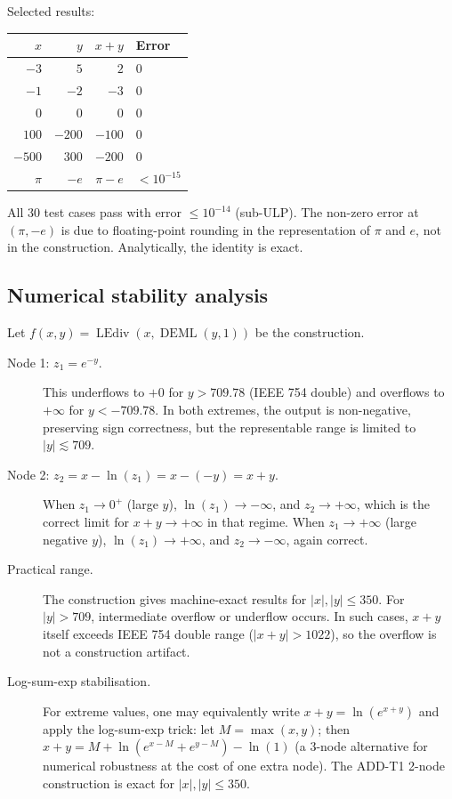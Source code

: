 \documentclass[12pt,a4paper]{article}
\theoremstyle{definition}
\newcommand{\DEML}{\operatorname{DEML}}
\newcommand{\LEdiv}{\operatorname{LEdiv}}
\begin{document}
Selected results:

\begin{center}
\begin{tabular}{rrrl}
\toprule
$x$ & $y$ & $x+y$ & Error \\
\midrule
$-3$   & $5$    & $2$       & $0$ \\
$-1$   & $-2$   & $-3$      & $0$ \\
$0$    & $0$    & $0$       & $0$ \\
$100$  & $-200$ & $-100$    & $0$ \\
$-500$ & $300$  & $-200$    & $0$ \\
$\pi$  & $-e$   & $\pi - e$ & $< 10^{-15}$ \\
\bottomrule
\end{tabular}
\end{center}

All 30 test cases pass with error $\le 10^{-14}$ (sub-ULP).
The non-zero error at $(\pi, -e)$ is due to floating-point rounding in the
representation of $\pi$ and $e$, not in the construction.
Analytically, the identity is exact.

\subsection{Numerical stability analysis}

Let $f(x,y) = \LEdiv(x, \DEML(y,1))$ be the construction.

\begin{description}
\item[Node 1: $z_1 = e^{-y}$.]
  This underflows to $+0$ for $y > 709.78$ (IEEE 754 double) and overflows
  to $+\infty$ for $y < -709.78$.
  In both extremes, the output is non-negative, preserving sign correctness,
  but the representable range is limited to $|y| \lesssim 709$.

\item[Node 2: $z_2 = x - \ln(z_1) = x - (-y) = x + y$.]
  When $z_1 \to 0^+$ (large $y$), $\ln(z_1) \to -\infty$, and $z_2 \to +\infty$,
  which is the correct limit for $x + y \to +\infty$ in that regime.
  When $z_1 \to +\infty$ (large negative $y$), $\ln(z_1) \to +\infty$,
  and $z_2 \to -\infty$, again correct.

\item[Practical range.]
  The construction gives machine-exact results for $|x|, |y| \le 350$.
  For $|y| > 709$, intermediate overflow or underflow occurs.
  In such cases, $x + y$ itself exceeds IEEE 754 double range
  ($|x+y| > 1022$), so the overflow is not a construction artifact.

\item[Log-sum-exp stabilisation.]
  For extreme values, one may equivalently write
  $x + y = \ln(e^{x+y})$ and apply the log-sum-exp trick:
  let $M = \max(x,y)$; then $x + y = M + \ln(e^{x-M} + e^{y-M}) - \ln(1)$
  (a 3-node alternative for numerical robustness at the cost of one extra node).
  The ADD-T1 2-node construction is exact for $|x|, |y| \le 350$.
\end{description}
\end{document}
